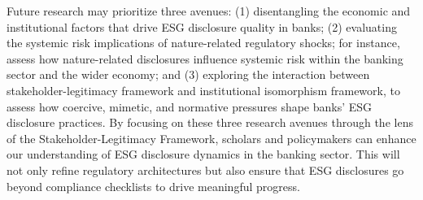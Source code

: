 \documentclass[
  authoryear]{elsarticle}
\begin{document}
Future research may prioritize three avenues: (1) disentangling the
economic and institutional factors that drive ESG disclosure quality in
banks; (2) evaluating the systemic risk implications of nature-related
regulatory shocks; for instance, assess how nature-related disclosures
influence systemic risk within the banking sector and the wider economy;
and (3) exploring the interaction between stakeholder-legitimacy
framework and institutional isomorphism framework, to assess how
coercive, mimetic, and normative pressures shape banks' ESG disclosure
practices. By focusing on these three research avenues through the lens
of the Stakeholder-Legitimacy Framework, scholars and policymakers can
enhance our understanding of ESG disclosure dynamics in the banking
sector. This will not only refine regulatory architectures but also
ensure that ESG disclosures go beyond compliance checklists to drive
meaningful progress.


\renewcommand\refname{Reference}
  
\end{document}

